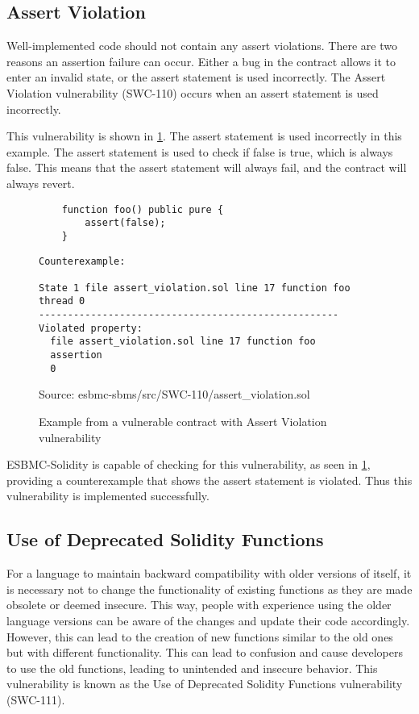 \subsection{Assert Violation}
\label{sec:assert_violation}

Well-implemented code should not contain any assert violations. There are two reasons an assertion failure can occur. Either a bug in the contract allows it to enter an invalid state, or the assert statement is used incorrectly. The Assert Violation vulnerability (SWC-110) occurs when an assert statement is used incorrectly. 

This vulnerability is shown in \ref{fig:assert_violation}. The assert statement is used incorrectly in this example. The assert statement is used to check if false is true, which is always false. This means that the assert statement will always fail, and the contract will always revert. 

\begin{figure}
\begin{lstlisting}
    function foo() public pure {
        assert(false);
    }
\end{lstlisting}

\begin{lstlisting}
Counterexample:

State 1 file assert_violation.sol line 17 function foo thread 0
----------------------------------------------------
Violated property:
  file assert_violation.sol line 17 function foo
  assertion
  0
\end{lstlisting}
\caption{Example from a vulnerable contract with Assert Violation vulnerability }
Source: esbmc-sbms/src/SWC-110/assert\_violation.sol
\label{fig:assert_violation}
\end{figure}

ESBMC-Solidity is capable of checking for this vulnerability, as seen in \ref{fig:assert_violation}, providing a counterexample that shows the assert statement is violated. Thus this vulnerability is implemented successfully.

\subsection{Use of Deprecated Solidity Functions}
\label{sec:use_of_deprecated_solidity_functions}

For a language to maintain backward compatibility with older versions of itself, it is necessary not to change the functionality of existing functions as they are made obsolete or deemed insecure. This way, people with experience using the older language versions can be aware of the changes and update their code accordingly. However, this can lead to the creation of new functions similar to the old ones but with different functionality. This can lead to confusion and cause developers to use the old functions, leading to unintended and insecure behavior. This vulnerability is known as the Use of Deprecated Solidity Functions vulnerability (SWC-111). 

